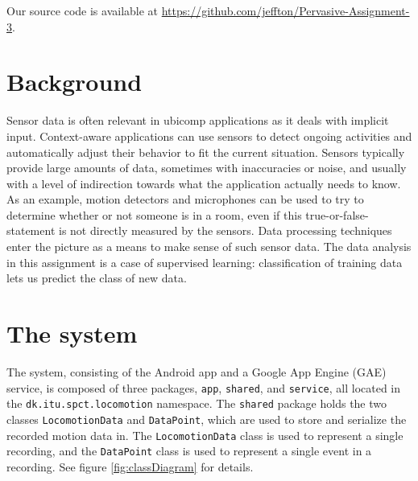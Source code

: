 \documentclass{ubicomp2012}
\begin{document}
Our source code is available at \url{https://github.com/jeffton/Pervasive-Assignment-3}.

\section{Background}

Sensor data is often relevant in ubicomp applications as it deals with implicit input. Context-aware applications can use sensors to detect ongoing activities and automatically adjust their behavior to fit the current situation. Sensors typically provide large amounts of data, sometimes with inaccuracies or noise, and usually with a level of indirection towards what the application actually needs to know. As an example, motion detectors and microphones can be used to try to determine whether or not someone is in a room, even if this true-or-false-statement is not directly measured by the sensors. Data processing techniques enter the picture as a means to make sense of such sensor data.
The data analysis in this assignment is a case of supervised learning: classification of training data lets us predict the class of new data.

\section{The system}

The system, consisting of the Android app and a Google App Engine (GAE) service, is composed of three packages, \lstinline[mathescape]{app}, \lstinline[mathescape]{shared}, and \lstinline[mathescape]{service}, all located in the \lstinline[mathescape]{dk.itu.spct.locomotion} namespace. The \lstinline[mathescape]{shared} package holds the two classes \lstinline[mathescape]{LocomotionData} and \lstinline[mathescape]{DataPoint}, which are used to store and serialize the recorded motion data in. The \lstinline[mathescape]{LocomotionData} class is used to represent a single recording, and the \lstinline[mathescape]{DataPoint} class is used to represent a single event in a recording. See figure \ref{fig:classDiagram} for details.
\end{document}
